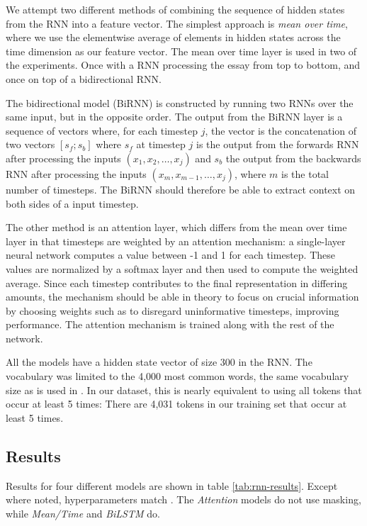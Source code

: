 We attempt two different methods of combining the sequence of hidden states
from the \ac{RNN} into a feature vector. The simplest approach is \emph{mean
over time}, where we use the elementwise average of elements in hidden states
across the time dimension as our feature vector. The mean over time layer is
used in two of the experiments. Once with a \ac{RNN} processing the essay
from top to bottom, and once on top of a bidirectional RNN.

The bidirectional model (BiRNN) is constructed by running two \acp{RNN} over
the same input, but in the opposite order. The output from the BiRNN layer is
a sequence of vectors where, for each timestep $j$, the vector is the
concatenation of two vectors $[s_f;s_b]$ where $s_f$ at timestep $j$ is the
output from the forwards \ac{RNN} after processing the inputs $(x_1, x_2,
\ldots, x_j)$ and $s_b$ the output from the backwards \ac{RNN} after
processing the inputs $(x_m, x_{m-1}, \ldots, x_j)$, where $m$ is the total
number of timesteps. The BiRNN should therefore be able to extract context on
both sides of a input timestep.


The other method is an attention layer, which differs from the mean over
time layer in that timesteps are weighted by an attention mechanism: a
single-layer neural network computes a value between -1 and 1 for each
timestep. These values are normalized by a softmax layer and then used to
compute the weighted average. Since each timestep contributes to the final
representation in differing amounts, the mechanism should be able in theory
to focus on crucial information by choosing weights such as to disregard
uninformative timesteps, improving performance. The attention mechanism is
trained along with the rest of the network.

All the models have a hidden state vector of size 300 in the \ac{RNN}. The
vocabulary was limited to the 4,000 most common words, the same vocabulary
size as is used in \textcite{taghipour16}. In our dataset, this is nearly
equivalent to using all tokens that occur at least 5 times: There are 4,031
tokens in our training set that occur at least 5 times.


\subsection{Results}

Results for four different models are shown in table \ref{tab:rnn-results}.
Except where noted, hyperparameters match \textcite{taghipour16}. The
\emph{Attention} models do not use masking, while \emph{Mean/Time} and
\emph{BiLSTM} do. 

